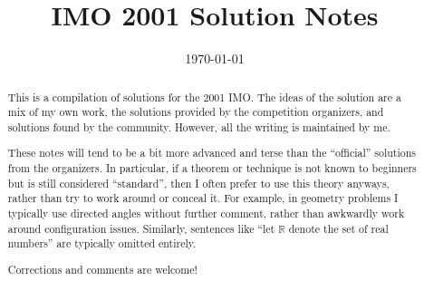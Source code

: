 \documentclass[11pt]{scrartcl}
\title{IMO 2001 Solution Notes}
\date{\today}
\begin{document}
\maketitle

\begin{abstract}
This is a compilation of solutions
for the 2001 IMO.
The ideas of the solution are a mix of my own work,
the solutions provided by the competition organizers,
and solutions found by the community.
However, all the writing is maintained by me.

These notes will tend to be a bit more advanced and terse than the ``official''
solutions from the organizers.
In particular, if a theorem or technique is not known to beginners
but is still considered ``standard'', then I often prefer to
use this theory anyways, rather than try to work around or conceal it.
For example, in geometry problems I typically use directed angles
without further comment, rather than awkwardly work around configuration issues.
Similarly, sentences like ``let $\mathbb{R}$ denote the set of real numbers''
are typically omitted entirely.

Corrections and comments are welcome!
\end{abstract}

\tableofcontents
\newpage

\addtocounter{section}{-1}
\end{document}

